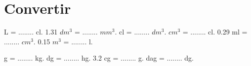 \section{Convertir}

\begin{questions}
\begin{Large}
		\begin{multicols}{2}
		 L = ........ cl.
		\question \num{1.31} $dm^3$ = ........ $mm^3$.
		 cl = ........ $dm^3$.
		 $cm^3$ = ........ cl.
		\question \num{0.29} ml = ........ $cm^3$.
		\question \num{0.15} $m^3$ = ........ l.
		
		 g = ........ kg.
		 dg = ........ hg.
		\question \num{3.2} cg = ........ g.
		 dag = ........ dg.
	\end{multicols}
\end{Large}
\end{questions}